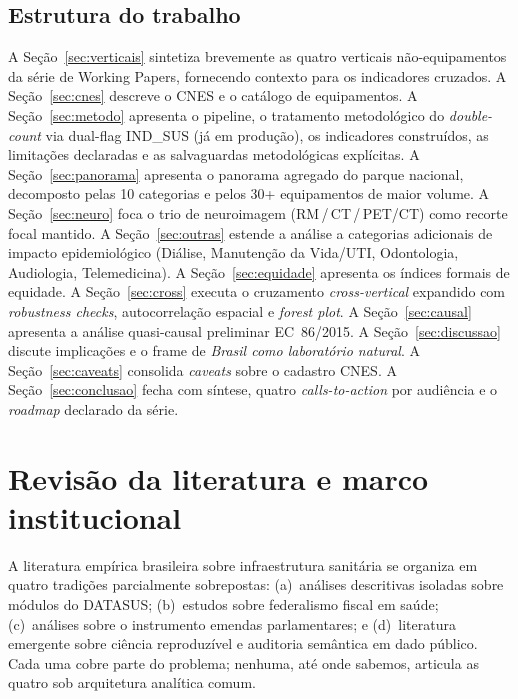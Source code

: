 \documentclass[12pt,a4paper,oneside]{article}
\begin{document}
\subsection{Estrutura do trabalho}

A Seção~\ref{sec:verticais} sintetiza brevemente as quatro verticais
não-equipamentos da série de Working Papers, fornecendo contexto para os indicadores
cruzados. A Seção~\ref{sec:cnes} descreve o CNES e o catálogo de
equipamentos. A Seção~\ref{sec:metodo} apresenta o pipeline, o
tratamento metodológico do \textit{double-count} via dual-flag
IND\_SUS (já em produção), os indicadores construídos, as
limitações declaradas e as salvaguardas metodológicas explícitas.
A Seção~\ref{sec:panorama} apresenta o panorama agregado do parque
nacional, decomposto pelas 10 categorias e pelos 30+ equipamentos
de maior volume. A Seção~\ref{sec:neuro} foca o trio de neuroimagem
(RM\,/\,CT\,/\,PET/CT) como recorte focal mantido. A
Seção~\ref{sec:outras} estende a análise a categorias adicionais
de impacto epidemiológico (Diálise, Manutenção da Vida/UTI,
Odontologia, Audiologia, Telemedicina). A Seção~\ref{sec:equidade}
apresenta os índices formais de equidade. A Seção~\ref{sec:cross}
executa o cruzamento \textit{cross-vertical} expandido com
\textit{robustness checks}, autocorrelação espacial e \textit{forest
plot}. A Seção~\ref{sec:causal} apresenta a análise quasi-causal
preliminar EC~86/2015. A Seção~\ref{sec:discussao} discute
implicações e o frame de \textit{Brasil como laboratório natural}.
A Seção~\ref{sec:caveats} consolida \textit{caveats} sobre o
cadastro CNES. A Seção~\ref{sec:conclusao} fecha com síntese,
quatro \textit{calls-to-action} por audiência e o \textit{roadmap}
declarado da série.

\section{Revisão da literatura e marco institucional}\label{sec:literatura}

A literatura empírica brasileira sobre infraestrutura sanitária se
organiza em quatro tradições parcialmente sobrepostas: (a)~análises
descritivas isoladas sobre módulos do DATASUS; (b)~estudos sobre
federalismo fiscal em saúde; (c)~análises sobre o instrumento
emendas parlamentares; e (d)~literatura emergente sobre ciência
reproduzível e auditoria semântica em dado público. Cada uma cobre
parte do problema; nenhuma, até onde sabemos, articula as quatro
sob arquitetura analítica comum.
\end{document}
